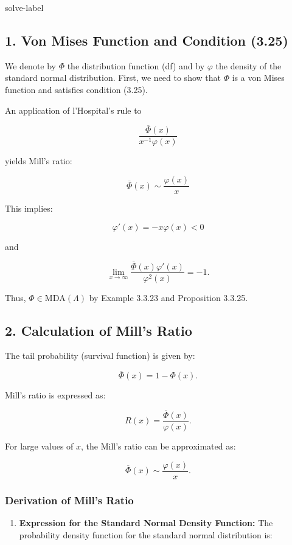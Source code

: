 	\begin{solve}{}{solve-label}
\subsection*{1. Von Mises Function and Condition (3.25)}

We denote by $\Phi$ the distribution function (df) and by $\varphi$ the density of the standard normal distribution. First, we need to show that $\Phi$ is a von Mises function and satisfies condition (3.25).

An application of l'Hospital's rule to 

\[ 
\frac{\overline{\Phi}(x)}{x^{-1}\varphi(x)} 
\]

yields Mill's ratio: 

\[ 
\overline{\Phi}(x) \sim \frac{\varphi(x)}{x} 
\]

This implies:

\[ 
\varphi'(x) = -x \varphi(x) < 0 
\]

and

\[ 
\lim_{x \to \infty} \frac{\overline{\Phi}(x) \varphi'(x)}{\varphi^2(x)} = -1. 
\]

Thus, $\Phi \in \text{MDA}(\Lambda)$ by Example 3.3.23 and Proposition 3.3.25.

\subsection*{2. Calculation of Mill's Ratio}

The tail probability (survival function) is given by:

\[ 
\overline{\Phi}(x) = 1 - \Phi(x). 
\]

Mill's ratio is expressed as:

\[ 
R(x) = \frac{\overline{\Phi}(x)}{\varphi(x)}. 
\]

For large values of $x$, the Mill's ratio can be approximated as:

\[ 
\overline{\Phi}(x) \sim \frac{\varphi(x)}{x}. 
\]

\subsubsection*{Derivation of Mill's Ratio}

\begin{enumerate}
	\item \textbf{Expression for the Standard Normal Density Function:}
	The probability density function for the standard normal distribution is:
	

\end{enumerate}
\end{solve}
